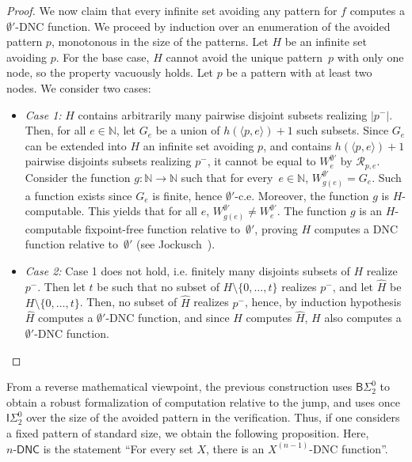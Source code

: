 \documentclass{article}
\newcommand{\ISig}{\mathsf{I}\Sigma^0}
\newcommand{\BSig}{\mathsf{B}\Sigma^0}
\newcommand{\RCA}[0]{\mathsf{RCA}}
\newcommand{\RT}[0]{\mathsf{RT}}
\newcommand{\NN}[0]{\mathbb{N}}
\def\qt#1{``#1''}%
\def\NN{\mathbb{N}}
\newcommand{\R}{\mathcal{R}}
\newcommand{\DNCS}[1]{#1\mbox{-}\mathsf{DNC}}
\def\qt#1{``#1''}%
\numberwithin{theorem}{section}
\newtheorem{proposition}[theorem]{Proposition}
\theoremstyle{definition}
\begin{document}
\begin{proof}
    We now claim that every infinite set avoiding any pattern for $f$ computes a $\emptyset'$-DNC function. We proceed by induction over an enumeration of the avoided pattern $p$, monotonous in the size of the patterns. Let $H$ be an infinite set avoiding $p$. 
    For the base case, $H$ cannot avoid the unique pattern~$p$ with only one node, so the property vacuously holds. Let $p$ be a pattern with at least two nodes. We consider two cases:
    \begin{itemize}
        \item \emph{Case 1:} $H$ contains arbitrarily many pairwise disjoint subsets realizing $|p^-|$. Then, for all $e \in \NN$, let $G_e$ be a union of $h(\langle p,e \rangle)+1$ such subsets. Since $G_e$ can be extended into $H$ an infinite set avoiding $p$, and contains $h(\langle p,e \rangle)+1$ pairwise disjoints subsets realizing $p^-$,  it cannot be equal to $W^{\emptyset'}_e$ by $\R_{p,e   }$. Consider the function $g : \NN \to \NN$ such that for every~$e \in \NN$, $W^{\emptyset'}_{g(e)} = G_e$. Such a function exists since $G_e$ is finite, hence $\emptyset'$-c.e. Moreover, the function $g$ is $H$-computable. This yields that for all $e$, $W^{\emptyset'}_{g(e)} \neq W^{\emptyset'}_e$. The function $g$ is an $H$-computable fixpoint-free function relative to~$\emptyset'$, proving $H$ computes a DNC function relative to~$\emptyset'$ (see Jockusch~\cite{jockusch1989recursively}). 
        \item \emph{Case 2:} Case 1 does not hold, i.e. finitely many disjoints subsets of $H$ realize $p^-$. Then let $t$ be such that no subset of $H \setminus \{0, \dots, t\}$ realizes $p^-$, and let $\hat H$ be $H \setminus \{ 0, \dots, t \}$. Then, no subset of $\hat H$ realizes $p^-$, hence, by induction hypothesis $\hat H$ computes a $\emptyset'$-DNC function, and since $H$ computes $\hat H$, $H$ also computes a $\emptyset'$-DNC function. 
    \end{itemize}


\end{proof}

From a reverse mathematical viewpoint, the previous construction uses $\BSig_2$ to obtain a robust formalization of computation relative to the jump, and uses once $\ISig_2$ over the size of the avoided pattern in the verification. Thus, if one considers a fixed pattern of standard size, we obtain the following proposition. Here, $\DNCS{n}$ is the statement \qt{For every set $X$, there is an $X^{(n-1)}$-DNC function}.

\end{document}
